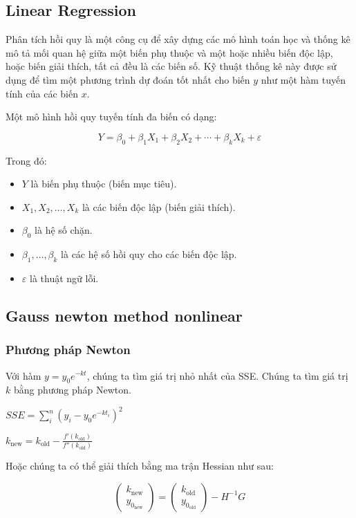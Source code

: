 \documentclass[conference]{IEEEtran}
\begin{document}
\subsection{Linear Regression}
Phân tích hồi quy là một công cụ để xây dựng các mô hình toán học và thống kê mô tả mối quan hệ giữa một biến phụ thuộc và một hoặc nhiều biến độc lập, hoặc biến giải thích, tất cả đều là các biến số. Kỹ thuật thống kê này được sử dụng để tìm một phương trình dự đoán tốt nhất cho biến \( y \) như một hàm tuyến tính của các biến \( x \).

Một mô hình hồi quy tuyến tính đa biến có dạng:

\[ Y = \beta_0 + \beta_1X_1 + \beta_2X_2 + \cdots + \beta_kX_k + \varepsilon \]

Trong đó:
\begin{itemize}
    \item \( Y \) là biến phụ thuộc (biến mục tiêu).
    \item \( X_1, X_2, \ldots, X_k \) là các biến độc lập (biến giải thích).
    \item \( \beta_0 \) là hệ số chặn.
    \item \( \beta_1, \ldots, \beta_k \) là các hệ số hồi quy cho các biến độc lập.
    \item \( \varepsilon \) là thuật ngữ lỗi.
\end{itemize}


\subsection{Gauss newton method nonlinear}

\subsubsection{Phương pháp Newton}
Với hàm \( y = y_0 e^{-kt} \), chúng ta tìm giá trị nhỏ nhất của SSE. Chúng ta tìm giá trị \(k\) bằng phương pháp Newton.

\begin{center}
    $SSE = \sum_{i}^{n}(y_i - y_0 e^{-kt_i})^2$
\end{center}

\begin{center}
    \(k_{\text{new}} = k_{\text{old}} - \frac{f'(k_{\text{old}})}{f''(k_{\text{old}})}\)
\end{center}

Hoặc chúng ta có thể giải thích bằng ma trận Hessian như sau:

\begin{center}
    \[
        \begin{pmatrix}
            k_{\text{new}} \\ y_{0_\text{new}}
        \end{pmatrix} =
        \begin{pmatrix}
            k_{\text{old}} \\ y_{0_\text{old}}
        \end{pmatrix} - H^{-1}G
    \]
\end{center}
\end{document}
